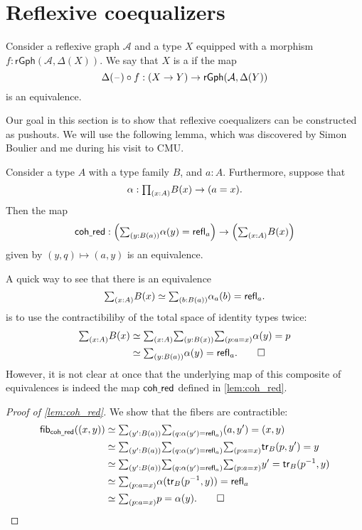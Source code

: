 \section{Reflexive coequalizers}

\begin{defn}
Consider a reflexive graph $\mathcal{A}$ and a type $X$ equipped with a morphism $f:\mathsf{rGph}(\mathcal{A},\Delta(X))$. We say that $X$ is a  if the map
\begin{equation*}
\Delta(\mathord{\hspace{1pt}\text{--}\hspace{1pt}}) \circ f: (X\to Y)\to \mathsf{rGph}(\mathcal{A},\Delta(Y))
\end{equation*}
is an equivalence.
\end{defn}

Our goal in this section is to show that reflexive coequalizers can be constructed as pushouts. We will use the following lemma, which was discovered by Simon Boulier and me during his visit to CMU.

\begin{lem}\label{lem:coh_red}
Consider a type $A$ with a type family $B$, and $a:A$. Furthermore, suppose that
\begin{equation*}
\alpha:\prd{x:A}B(x)\to (a=x).
\end{equation*}
Then the  map
\begin{equation*}
\mathsf{coh\usc{}red} : \Big(\sm{y:B(a)}\alpha(y)=\refl{a}\Big)\to\Big(\sm{x:A}B(x)\Big)
\end{equation*}
given by $(y,q)\mapsto (a,y)$ is an equivalence.
\end{lem}

\begin{rmk}
A quick way to see that there is an equivalence
\begin{equation*}
\sm{x:A}B(x) \eqvsym \sm{b:B(a)} \alpha_{a}(b)=\refl{a}.
\end{equation*}
is to use the contractibiliby of the total space of identity types twice:
\begin{align*}
\sm{x:A}B(x) & \eqvsym \sm{x:A}{y:B(x)}{p:a=x}\alpha(y)=p \\
& \eqvsym \sm{y:B(a)}\alpha(y)=\refl{a}.\qedhere
\end{align*}
However, it is not clear at once that the underlying map of this composite of equivalences is indeed the map $\mathsf{coh\underline{\ }{}red}$ defined in \cref{lem:coh_red}.
\end{rmk}

\begin{proof}[Proof of \cref{lem:coh_red}]
We show that the fibers are contractible:
\begin{align*}
\fib{\mathsf{coh\usc{}red}}{(x,y)} & \eqvsym \sm{y':B(a)}{q:\alpha(y')=\refl{a}} (a,y')=(x,y) \\
& \eqvsym \sm{y':B(a)}{q:\alpha(y')=\refl{a}}{p:a=x} \mathsf{tr}_B(p,y')=y \\
& \eqvsym \sm{y':B(a)}{q:\alpha(y')=\refl{a}}{p:a=x} y'=\mathsf{tr}_B(p^{-1},y) \\
& \eqvsym \sm{p:a=x}\alpha(\mathsf{tr}_B(p^{-1},y))=\refl{a} \\
& \eqvsym \sm{p:a=x}p=\alpha(y).\qedhere
\end{align*}
\end{proof}

